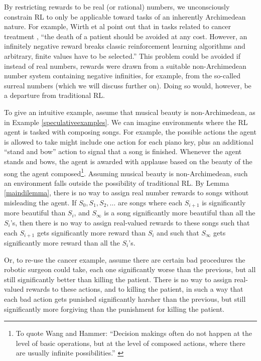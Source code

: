 \documentclass[reqno]{article}
\theoremstyle{definition}
\begin{document}
By restricting rewards to be real (or rational) numbers, we unconsciously
constrain RL to only be applicable toward tasks of an inherently Archimedean
nature. For example, Wirth et al point out \cite{wirth2017survey} that
in tasks related to cancer treatment \cite{zhao2009reinforcement},
``the death of a patient should be avoided at any cost. However, an
infinitely negative reward breaks classic reinforcement learning algorithms
and arbitrary, finite values have to be selected.'' This problem could be
avoided if instead of real numbers, rewards were drawn from a suitable
non-Archimedean number system containing negative infinities,
for example, from the so-called
surreal numbers (which we will discuss further on). Doing so would, however,
be a departure from traditional RL.

To give an intuitive example, assume that musical beauty is non-Archimedean,
as in Example \ref{speculativeexamples}. We can imagine environments where the
RL agent is tasked with composing songs. For example, the possible actions the
agent is allowed to take might include one action for each piano key, plus
an additional ``stand and bow'' action to signal that a song is
finished.
Whenever the agent stands and bows, the agent is awarded with applause based on
the beauty of the song the agent
composed\footnote{To quote Wang and Hammer: ``Decision makings often do not happen
at the level of basic operations, but at the level of composed actions, where
there are usually infinite possibilities.'' \cite{wang2015assumptions}}. Assuming
musical beauty is
non-Archimedean, such an environment falls outside the possibility of traditional
RL. By Lemma \ref{maindilemma}, there is no way to assign real number
rewards to songs without misleading the agent. If $S_0,S_1,S_2,\ldots$ are songs
where each $S_{i+1}$ is significantly more beautiful than $S_i$, and $S_\infty$
is a song significantly more beautiful than all the $S_i$'s, then there is no way to
assign real-valued rewards to these songs such that each $S_{i+1}$ gets
significantly more reward than $S_i$ and such that $S_\infty$ gets significantly
more reward than all the $S_i$'s.

Or, to re-use the cancer example, assume there are certain bad procedures the
robotic surgeon could take, each one significantly worse than the previous,
but all still significantly better than killing the patient. There is no way
to assign real-valued rewards to these actions, and to killing the patient,
in such a way that each bad action gets punished significantly harsher than
the previous, but still significantly more forgiving than the punishment for
killing the patient.
\end{document}
